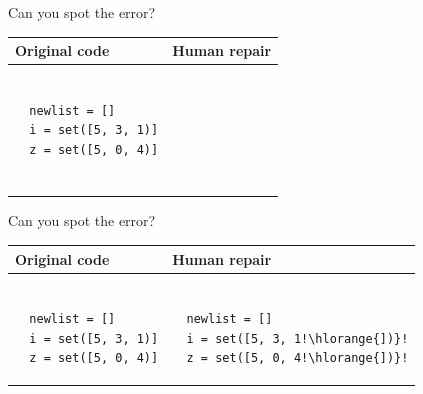\documentclass{beamer}
\begin{document}
\begin{frame}[fragile]{Can you spot the error?}
  \begin{center}
    \begin{tabular}{|m{5.5cm}|m{5.5cm}|}
      \hline \rule{0pt}{2.5ex}\textbf{Original code}\rule[-1ex]{0pt}{2ex} &  \rule{0pt}{2.5ex}\textbf{Human repair}\rule[-1ex]{0pt}{2ex} \\\hline
      \begin{lstlisting}[escapechar=!, basicstyle=\linespread{1.3}\ttfamily\footnotesize]

  newlist = []
  i = set([5, 3, 1)]
  z = set([5, 0, 4)]


      \end{lstlisting} & \begin{lstlisting}[escapechar=!, basicstyle=\linespread{1.3}\ttfamily\footnotesize]

      \end{lstlisting} \\\hline
    \end{tabular}
  \end{center}
\end{frame}

\begin{frame}[fragile]{Can you spot the error?}
  \begin{center}
    \begin{tabular}{|m{5.5cm}|m{5.5cm}|}
      \hline \rule{0pt}{2.5ex}\textbf{Original code}\rule[-1ex]{0pt}{2ex} &  \rule{0pt}{2.5ex}\textbf{Human repair}\rule[-1ex]{0pt}{2ex} \\\hline
      \begin{lstlisting}[escapechar=!, basicstyle=\linespread{1.3}\ttfamily\footnotesize]

  newlist = []
  i = set([5, 3, 1)]
  z = set([5, 0, 4)]

      \end{lstlisting} & \begin{lstlisting}[escapechar=!, basicstyle=\linespread{1.3}\ttfamily\footnotesize]

  newlist = []
  i = set([5, 3, 1!\hlorange{])}!
  z = set([5, 0, 4!\hlorange{])}!

      \end{lstlisting} \\\hline
    \end{tabular}
  \end{center}
\end{frame}
\end{document}
